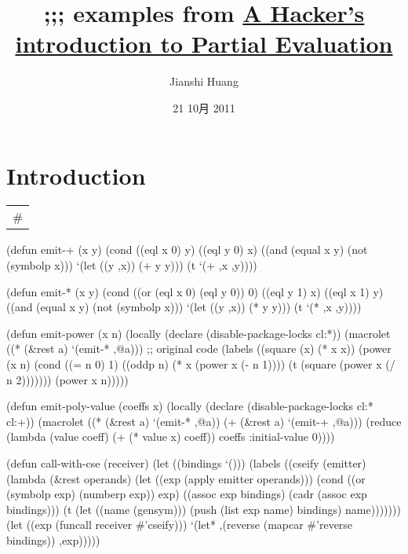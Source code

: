 \documentclass[svgnames,11pt]{article}
\title{;;; examples from \underline{A Hacker's introduction to Partial Evaluation}}
\author{Jianshi Huang}
\date{21 10月 2011}
\begin{document}
\maketitle



\section{Introduction}
\label{sec-1}



\begin{center}
\begin{tabular}{l}
 \#  \\
\end{tabular}
\end{center}



(defun emit-+ (x y)
  (cond ((eql x 0) y)
        ((eql y 0) x)
        ((and (equal x y)
              (not (symbolp x)))
         `(let ((y ,x))
            (+ y y)))
        (t
         `(+ ,x ,y))))

(defun emit-* (x y)
  (cond ((or (eql x 0) (eql y 0)) 0) 
        ((eql y 1) x)
        ((eql x 1) y)
        ((and (equal x y)
              (not (symbolp x)))
         `(let ((y ,x))
            (* y y)))
        (t
         `(* ,x ,y))))

(defun emit-power (x n)
  (locally
      (declare (disable-package-locks cl:*))
    (macrolet ((* (\&rest a)
                 `(emit-* ,@a)))
      ;; original code
      (labels ((square (x)
                 (* x x))
               (power (x n)
                 (cond ((= n 0) 1)
                       ((oddp n) (* x (power x (- n 1))))
                       (t (square (power x (/ n 2)))))))
        (power x n)))))

(defun emit-poly-value (coeffs x)
  (locally (declare (disable-package-locks cl:* cl:+))
    (macrolet ((* (\&rest a)
                 `(emit-* ,@a))
               (+ (\&rest a)
                 `(emit-+ ,@a)))
      (reduce (lambda (value coeff)
                (+ (* value x) coeff))
              coeffs
              :initial-value 0))))

(defun call-with-cse (receiver)
  (let ((bindings `()))
    (labels ((cseify (emitter)
               (lambda (\&rest operands)
                 (let ((exp (apply emitter operands)))
                   (cond ((or (symbolp exp) (numberp exp))
                          exp)
                         ((assoc exp bindings)
                          (cadr (assoc exp bindings)))
                         (t
                          (let ((name (gensym)))
                            (push (list exp name) bindings)
                            name)))))))
      (let ((exp (funcall receiver \#'cseify)))
        `(let* ,(reverse (mapcar \#'reverse bindings))
           ,exp)))))
\end{document}
